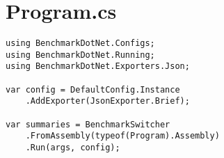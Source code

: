 
\section{Program.cs}\label{appendix:program}

\begin{lstlisting}
using BenchmarkDotNet.Configs;
using BenchmarkDotNet.Running;
using BenchmarkDotNet.Exporters.Json;

var config = DefaultConfig.Instance
    .AddExporter(JsonExporter.Brief);

var summaries = BenchmarkSwitcher
    .FromAssembly(typeof(Program).Assembly)
    .Run(args, config);
\end{lstlisting}
